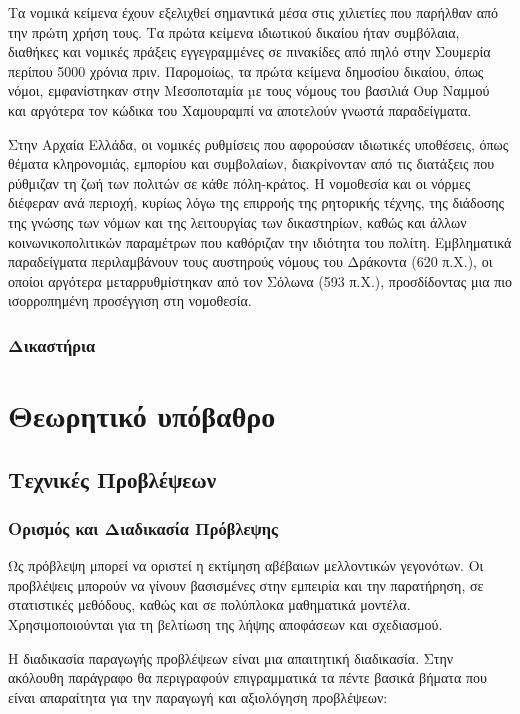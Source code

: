 \documentclass[diploma]{softlab-thesis}
\begin{document}
Τα νομικά κείμενα έχουν εξελιχθεί σημαντικά μέσα στις χιλιετίες που παρήλθαν από την πρώτη χρήση τους. Τα πρώτα κείμενα ιδιωτικού δικαίου ήταν συμβόλαια, διαθήκες και νομικές πράξεις εγγεγραμμένες σε πινακίδες από πηλό στην Σουμερία περίπου 5000 χρόνια πριν. Παρομοίως, τα πρώτα κείμενα δημοσίου δικαίου, όπως νόμοι, εμφανίστηκαν στην Μεσοποταμία µε τους νόμους του βασιλιά Ουρ Ναμμού και αργότερα τον κώδικα του Χαμουραμπί να αποτελούν γνωστά παραδείγματα. 

Στην Αρχαία Ελλάδα, οι νομικές ρυθμίσεις που αφορούσαν ιδιωτικές υποθέσεις, όπως θέματα
κληρονομιάς, εμπορίου και συμβολαίων, διακρίνονταν από τις διατάξεις που ρύθμιζαν τη ζωή των πολιτών σε κάθε πόλη-κράτος. Η νομοθεσία και οι νόρμες διέφεραν ανά περιοχή, κυρίως λόγω της επιρροής της ρητορικής τέχνης, της διάδοσης της γνώσης των νόμων και της λειτουργίας των δικαστηρίων, καθώς και άλλων κοινωνικοπολιτικών παραμέτρων που καθόριζαν την ιδιότητα του πολίτη. Εμβληματικά παραδείγματα περιλαμβάνουν τους αυστηρούς νόμους του Δράκοντα (620 π.Χ.), οι οποίοι αργότερα μεταρρυθμίστηκαν από τον Σόλωνα (593 π.Χ.), προσδίδοντας μια πιο ισορροπημένη προσέγγιση στη νομοθεσία.

\subsection{Δικαστήρια}




\chapter{Θεωρητικό υπόβαθρο}

\section{Τεχνικές Προβλέψεων}

\subsection{Ορισμός και Διαδικασία Πρόβλεψης}

Ως πρόβλεψη μπορεί να οριστεί η εκτίμηση αβέβαιων μελλοντικών γεγονότων. Οι προβλέψεις μπορούν να γίνουν βασισμένες στην εμπειρία και την παρατήρηση, σε στατιστικές μεθόδους, καθώς και σε πολύπλοκα μαθηματικά μοντέλα. Χρησιμοποιούνται για τη βελτίωση της λήψης αποφάσεων και σχεδιασμού. 

Η διαδικασία παραγωγής προβλέψεων είναι μια απαιτητική διαδικασία. Στην ακόλουθη παράγραφο θα περιγραφούν επιγραμματικά τα πέντε βασικά βήματα που είναι απαραίτητα για την παραγωγή και αξιολόγηση προβλέψεων:
\end{document}
